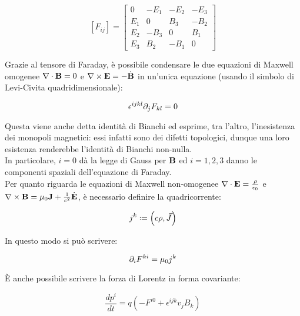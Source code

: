 \begin{equation}
	\left[F_{ij}\right] =
	\begin{bmatrix}
		0 & -E_1 & -E_2 & -E_3 \\
		E_1 & 0 & B_3 & -B_2 \\
		E_2 & -B_3 & 0 & B_1 \\
		E_3 & B_2 & -B_1 & 0
	\end{bmatrix}
	\label{eq:2.24}
\end{equation}

Grazie al tensore di Faraday, è possibile condensare le due equazioni di Maxwell omogenee $ \nabla\cdot\mathbf{B} = 0 $ e $ \nabla\times\mathbf{E} = - \dot{\mathbf{B}} $ in un'unica equazione (usando il simbolo di Levi-Civita quadridimensionale):

\begin{equation}
	\epsilon^{ijkl} \partial_j F_{kl} = 0
	\label{eq:2.25}
\end{equation}

Questa viene anche detta identità di Bianchi ed esprime, tra l'altro, l'inesistenza dei monopoli magnetici: essi infatti sono dei difetti topologici, dunque una loro esistenza renderebbe l'identità di Bianchi non-nulla.\\
In particolare, $ i = 0 $ dà la legge di Gauss per $ \mathbf{B} $ ed $ i = 1,2,3 $ danno le componenti spaziali dell'equazione di Faraday.\\
Per quanto riguarda le equazioni di Maxwell non-omogenee $ \nabla\cdot\mathbf{E} = \frac{\rho}{\epsilon_0} $ e $ \nabla\times\mathbf{B} = \mu_0 \mathbf{J} + \frac{1}{c^2} \dot{\mathbf{E}} $, è necessario definire la quadricorrente:

\begin{equation}
	j^k \defeq \left(c\rho, \vec{J}\right)
	\label{eq:2.26}
\end{equation}

In questo modo si può scrivere:

\begin{equation}
	\partial_i F^{ki} = \mu_0 j^k
	\label{eq:2.27}
\end{equation}

È anche possibile scrivere la forza di Lorentz in forma covariante:

\begin{equation}
	\frac{dp^i}{dt} = q \left(-F^{i0} + \epsilon^{ijk} v_j B_k\right)
	\label{eq:2.28}
\end{equation}

